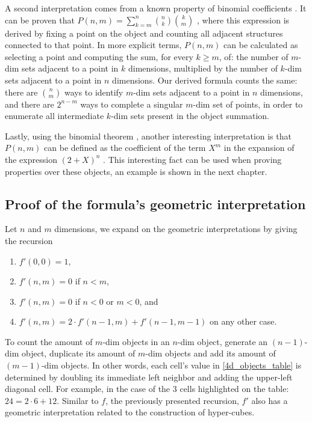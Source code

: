 \documentclass{article}
\begin{document}
	A second interpretation comes from a known property of binomial coefficients \cite{rice2007}. It can be proven that $P(n,m) = \sum_{k=m}^{n} \binom{n}{k} \binom{k}{m}$ \cite{countingHypercubes}, where this expression is derived by fixing a point on the object and counting all adjacent structures connected to that point. In more explicit terms, $P(n,m)$ can be calculated as selecting a point and computing the sum, for every $k\geq m$, of: the number of $m$-dim sets adjacent to a point in $k$ dimensions, multiplied by the number of $k$-dim sets adjacent to a point in $n$ dimensions. Our derived formula counts the same: there are $\binom{n}{m}$ ways to identify $m$-dim sets adjacent to a point in $n$ dimensions, and there are $2^{n-m}$ ways to complete a singular $m$-dim set of points, in order to enumerate all intermediate $k$-dim sets present in the object summation.
	
	Lastly, using the binomial theorem \cite{rice2007}, another interesting interpretation is that $P(n,m)$ can be defined as the coefficient of the term $X^{m}$ in the expansion of the expression $(2 + X)^{n}$ \cite{coxeter1973regular}. This interesting fact can be used when proving properties over these objects, an example is shown in the next chapter.
	
	
	\subsection{Proof of the formula's geometric interpretation}
	
	Let $n$ and $m$ dimensions, we expand on the geometric interpretations by giving the recursion \cite{coxeter1973regular}
	\begin{enumerate}
		\item $f'(0,0) = 1$,
		
		\item $f'(n,m) = 0$ if $n < m$,
		
		\item $f'(n,m) = 0$ if $n < 0$ or $m < 0$, and
		
		\item $f'(n,m) = 2 \cdot f'(n-1, m) + f'(n-1, m-1)$ on any other case.
	\end{enumerate}
	
	To count the amount of $m$-dim objects in an $n$-dim object, generate an $(n-1)$-dim object, duplicate its amount of $m$-dim objects and add its amount of $(m-1)$-dim objects. In other words, each cell's value in \autoref{4d_objects_table} is determined by doubling its immediate left neighbor and adding the upper-left diagonal cell. For example, in the case of the $3$ cells highlighted on the table: $24 = 2 \cdot 6 + 12$. Similar to $f$, the previously presented recursion, $f'$ also has a geometric interpretation related to the construction of hyper-cubes.
	
\end{document}

